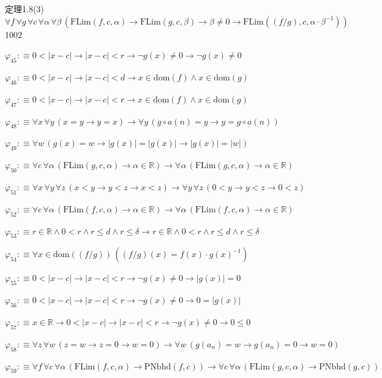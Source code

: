 \begin{fullproof}{定理1.8(3)}{$\forall f\,\forall g\,\forall c\,\forall \alpha\,\forall \beta\,(\mathrm{FLim}(f,c,\alpha) \to \mathrm{FLim}(g,c,\beta) \to \beta \neq 0 \to \mathrm{FLim}((f / g),c,\alpha \cdot \beta^{-1}))$}{1002}
\begin{abbrevlist}
\item $\varphi_{45} :\equiv 0 < \lvert x - c \rvert \to \lvert x - c \rvert < r \to \neg g(x) \neq 0 \to \neg g(x) \neq 0$
\item $\varphi_{46} :\equiv 0 < \lvert x - c \rvert \to \lvert x - c \rvert < d \to x \in \mathrm{dom}(f) \land x \in \mathrm{dom}(g)$
\item $\varphi_{47} :\equiv 0 < \lvert x - c \rvert \to \lvert x - c \rvert < r \to x \in \mathrm{dom}(f) \land x \in \mathrm{dom}(g)$
\item $\varphi_{48} :\equiv \forall x\,\forall y\,(x = y \to y = x) \to \forall y\,(g \circ a(n) = y \to y = g \circ a(n))$
\item $\varphi_{49} :\equiv \forall w\,(g(x) = w \to \lvert g(x) \rvert = \lvert g(x) \rvert \to \lvert g(x) \rvert = \lvert w \rvert)$
\item $\varphi_{50} :\equiv \forall c\,\forall \alpha\,(\mathrm{FLim}(g,c,\alpha) \to \alpha \in \mathbb{R}) \to \forall \alpha\,(\mathrm{FLim}(g,c,\alpha) \to \alpha \in \mathbb{R})$
\item $\varphi_{51} :\equiv \forall x\,\forall y\,\forall z\,(x < y \to y < z \to x < z) \to \forall y\,\forall z\,(0 < y \to y < z \to 0 < z)$
\item $\varphi_{52} :\equiv \forall c\,\forall \alpha\,(\mathrm{FLim}(f,c,\alpha) \to \alpha \in \mathbb{R}) \to \forall \alpha\,(\mathrm{FLim}(f,c,\alpha) \to \alpha \in \mathbb{R})$
\item $\varphi_{53} :\equiv r \in \mathbb{R} \land 0 < r \land r \leq d \land r \leq \delta \to r \in \mathbb{R} \land 0 < r \land r \leq d \land r \leq \delta$
\item $\varphi_{54} :\equiv \forall x \in \mathrm{dom}((f / g))\,((f / g)(x) = f(x) \cdot g(x)^{-1})$
\item $\varphi_{55} :\equiv 0 < \lvert x - c \rvert \to \lvert x - c \rvert < r \to \neg g(x) \neq 0 \to \lvert g(x) \rvert = 0$
\item $\varphi_{56} :\equiv 0 < \lvert x - c \rvert \to \lvert x - c \rvert < r \to \neg g(x) \neq 0 \to 0 = \lvert g(x) \rvert$
\item $\varphi_{57} :\equiv x \in \mathbb{R} \to 0 < \lvert x - c \rvert \to \lvert x - c \rvert < r \to \neg g(x) \neq 0 \to 0 \leq 0$
\item $\varphi_{58} :\equiv \forall z\,\forall w\,(z = w \to z = 0 \to w = 0) \to \forall w\,(g(a_{n}) = w \to g(a_{n}) = 0 \to w = 0)$
\item $\varphi_{59} :\equiv \forall f\,\forall c\,\forall \alpha\,(\mathrm{FLim}(f,c,\alpha) \to \mathrm{PNbhd}(f,c)) \to \forall c\,\forall \alpha\,(\mathrm{FLim}(g,c,\alpha) \to \mathrm{PNbhd}(g,c))$

\end{abbrevlist}
\end{fullproof}
